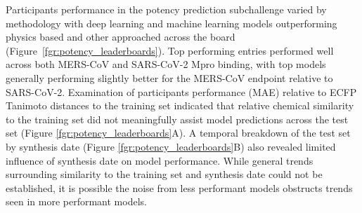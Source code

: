 \documentclass[journal=jcim,manuscript=article]{achemso}
\begin{document}
Participants performance in the potency prediction subchallenge varied by methodology with deep learning and machine learning models outperforming physics based and other approached across the board (Figure~\ref{fgr:potency_leaderboards}). Top performing entries performed well across both MERS-CoV and SARS-CoV-2 Mpro binding, with top models generally performing slightly better for the MERS-CoV endpoint relative to SARS-CoV-2. Examination of participants performance (MAE) relative to ECFP Tanimoto distances to the training set indicated that relative chemical similarity to the training set did not meaningfully assist model predictions across the test set (Figure \ref{fgr:potency_leaderboards}A). A temporal breakdown of the test set by synthesis date (Figure \ref{fgr:potency_leaderboards}B) also revealed limited influence of synthesis date on model performance. While general trends surrounding similarity to the training set and synthesis date could not be established, it is possible the noise from less performant models obstructs trends seen in more performant models.
\end{document}
